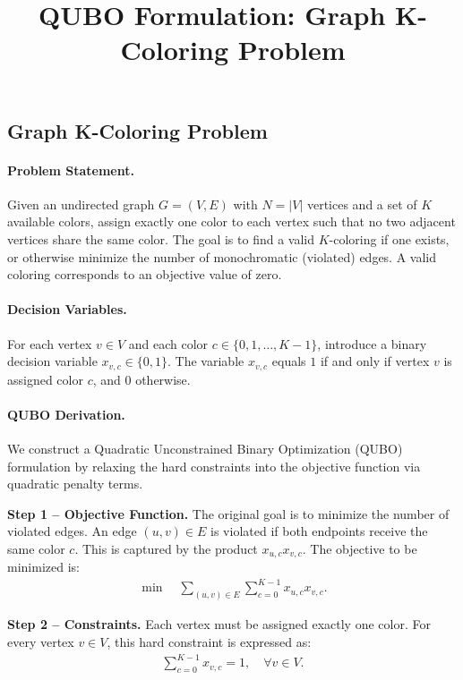 \documentclass[12pt]{article}
\title{QUBO Formulation: Graph K-Coloring Problem}
\date{}
\begin{document}
\maketitle

\subsection*{Graph K-Coloring Problem}

\paragraph{Problem Statement.}
Given an undirected graph $G=(V,E)$ with $N=|V|$ vertices and a set of $K$ available colors, assign exactly one color to each vertex such that no two adjacent vertices share the same color. The goal is to find a valid $K$-coloring if one exists, or otherwise minimize the number of monochromatic (violated) edges. A valid coloring corresponds to an objective value of zero.

\paragraph{Decision Variables.}
For each vertex $v \in V$ and each color $c \in \{0, 1, \dots, K-1\}$, introduce a binary decision variable $x_{v,c} \in \{0,1\}$. The variable $x_{v,c}$ equals $1$ if and only if vertex $v$ is assigned color $c$, and $0$ otherwise.

\paragraph{QUBO Derivation.}
We construct a Quadratic Unconstrained Binary Optimization (QUBO) formulation by relaxing the hard constraints into the objective function via quadratic penalty terms.

\textbf{Step 1 -- Objective Function.}
The original goal is to minimize the number of violated edges. An edge $(u,v) \in E$ is violated if both endpoints receive the same color $c$. This is captured by the product $x_{u,c}x_{v,c}$. The objective to be minimized is:
\begin{align}
    \min \quad \sum_{(u,v) \in E} \sum_{c=0}^{K-1} x_{u,c} x_{v,c}.
\end{align}

\textbf{Step 2 -- Constraints.}
Each vertex must be assigned exactly one color. For every vertex $v \in V$, this hard constraint is expressed as:
\begin{align}
    \sum_{c=0}^{K-1} x_{v,c} = 1, \quad \forall v \in V.
\end{align}
\end{document}
